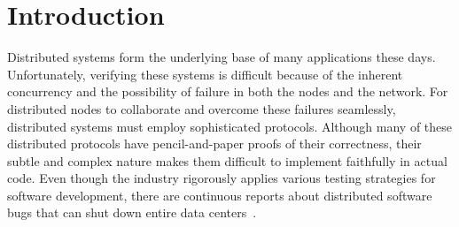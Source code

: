 \section{Introduction}
\label{sec:intro}






Distributed systems form the underlying base of many applications these days.
Unfortunately, verifying these systems is difficult because of the inherent concurrency and the possibility of failure in both the nodes and the network.
For distributed nodes to collaborate and overcome these failures seamlessly,
distributed systems must employ sophisticated protocols.
Although many of these distributed protocols have pencil-and-paper proofs of their correctness,
their subtle and complex nature makes them difficult to implement faithfully in actual code.
Even though the industry rigorously applies various testing strategies 
for software development, there are continuous reports about distributed software bugs that can shut down entire data centers~\cite{awsdown, gmaildown}.

